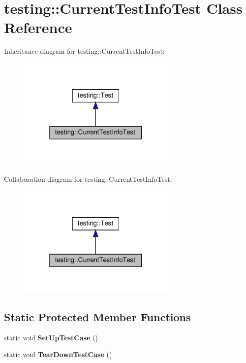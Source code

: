 \hypertarget{classtesting_1_1_current_test_info_test}{}\section{testing\+:\+:Current\+Test\+Info\+Test Class Reference}
\label{classtesting_1_1_current_test_info_test}


Inheritance diagram for testing\+:\+:Current\+Test\+Info\+Test\+:
\nopagebreak
\begin{figure}[H]
\begin{center}
\leavevmode
\includegraphics[width=220pt]{classtesting_1_1_current_test_info_test__inherit__graph}
\end{center}
\end{figure}


Collaboration diagram for testing\+:\+:Current\+Test\+Info\+Test\+:
\nopagebreak
\begin{figure}[H]
\begin{center}
\leavevmode
\includegraphics[width=220pt]{classtesting_1_1_current_test_info_test__coll__graph}
\end{center}
\end{figure}
\subsection*{Static Protected Member Functions}
\begin{DoxyCompactItemize}
\item 
\mbox{\label{classtesting_1_1_current_test_info_test_a61bad7ce29923afd464daf9684b6269e}} 
static void {\bfseries Set\+Up\+Test\+Case} ()
\item 
\mbox{\label{classtesting_1_1_current_test_info_test_a9a80a5a3e6e70c619870c2ae9df892a6}} 
static void {\bfseries Tear\+Down\+Test\+Case} ()
\end{DoxyCompactItemize}
